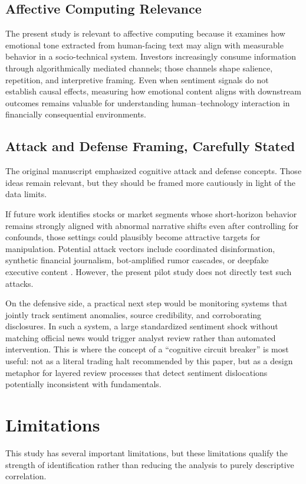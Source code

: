 \documentclass[lettersize,journal]{IEEEtran}
\begin{document}
\subsection{Affective Computing Relevance}
The present study is relevant to affective computing because it examines how emotional tone extracted from human-facing text may align with measurable behavior in a socio-technical system. Investors increasingly consume information through algorithmically mediated channels; those channels shape salience, repetition, and interpretive framing. Even when sentiment signals do not establish causal effects, measuring how emotional content aligns with downstream outcomes remains valuable for understanding human--technology interaction in financially consequential environments.

\subsection{Attack and Defense Framing, Carefully Stated}
The original manuscript emphasized cognitive attack and defense concepts. Those ideas remain relevant, but they should be framed more cautiously in light of the data limits.

If future work identifies stocks or market segments whose short-horizon behavior remains strongly aligned with abnormal narrative shifts even after controlling for confounds, those settings could plausibly become attractive targets for manipulation. Potential attack vectors include coordinated disinformation, synthetic financial journalism, bot-amplified rumor cascades, or deepfake executive content \cite{shamo2024deepfake}. However, the present pilot study does not directly test such attacks.

On the defensive side, a practical next step would be monitoring systems that jointly track sentiment anomalies, source credibility, and corroborating disclosures. In such a system, a large standardized sentiment shock without matching official news would trigger analyst review rather than automated intervention. This is where the concept of a ``cognitive circuit breaker'' is most useful: not as a literal trading halt recommended by this paper, but as a design metaphor for layered review processes that detect sentiment dislocations potentially inconsistent with fundamentals.

\section{Limitations}
\label{sec:limitations}
This study has several important limitations, but these limitations qualify the strength of identification rather than reducing the analysis to purely descriptive correlation.
\end{document}

